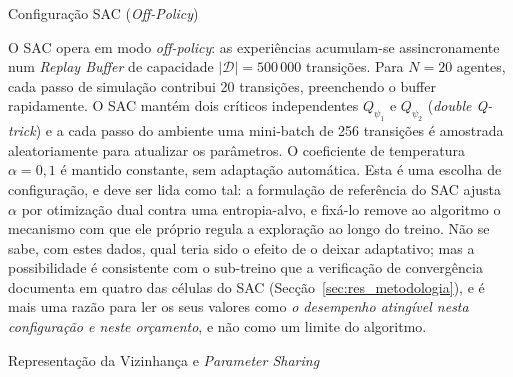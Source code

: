 \documentclass[12pt,reqno, twoside]{amsbook}
\makeatletter
\def\subsection{\@startsection{subsection}{2}%
      \z@{.5\linespacing\@plus.7\linespacing}{.25\linespacing}%
      {\normalfont\bfseries\flushleft}}
\theoremstyle{plain}
\numberwithin{equation}{chapter}
\numberwithin{section}{chapter}
\numberwithin{table}{chapter}
\numberwithin{figure}{chapter}
\makeatother
\begin{document}
\subsection{Configuração SAC (\textit{Off-Policy})}

O SAC opera em modo \textit{off-policy}: as experiências acumulam-se assincronamente num \emph{Replay Buffer} de capacidade $|\mathcal{D}|=500\,000$ transições. Para $N=20$ agentes, cada passo de simulação contribui 20 transições, preenchendo o buffer rapidamente. O SAC mantém dois críticos independentes $Q_{\psi_1}$ e $Q_{\psi_2}$ (\textit{double Q-trick}) e a cada passo do ambiente uma mini-batch de 256 transições é amostrada aleatoriamente para atualizar os parâmetros. O coeficiente de temperatura $\alpha=0{,}1$ é mantido constante, sem adaptação automática. Esta é uma escolha de configuração, e deve ser lida como tal: a formulação de referência do SAC ajusta $\alpha$ por otimização dual contra uma entropia-alvo, e fixá-lo remove ao algoritmo o mecanismo com que ele próprio regula a exploração ao longo do treino. Não se sabe, com estes dados, qual teria sido o efeito de o deixar adaptativo; mas a possibilidade é consistente com o sub-treino que a verificação de convergência documenta em quatro das células do SAC (Secção~\ref{sec:res_metodologia}), e é mais uma razão para ler os seus valores como \emph{o desempenho atingível nesta configuração e neste orçamento}, e não como um limite do algoritmo.

\subsection{Representação da Vizinhança e \textit{Parameter Sharing}}
\end{document}
